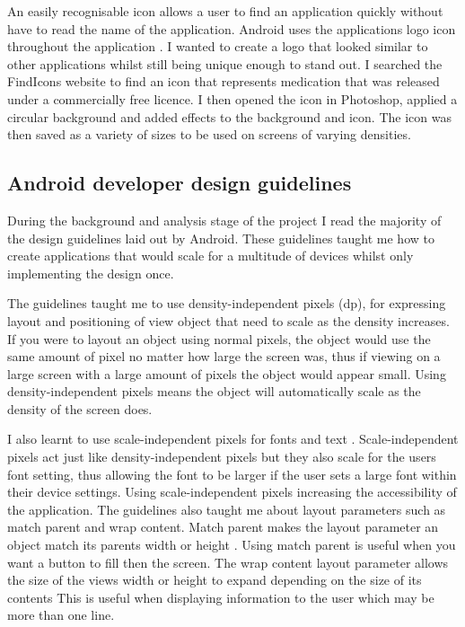 An easily recognisable icon allows a user to find an application quickly without have to read the name of the application. Android uses the applications logo icon throughout the application \cite{android}. I wanted to create a logo that looked similar to other applications whilst still being unique enough to stand out. I searched the FindIcons website \cite{findicons} to find an icon that represents medication that was released under a commercially free licence. I then opened the icon in Photoshop, applied a circular background and added effects to the background and icon. The icon was then saved as a variety of sizes to be used on screens of varying densities.

\subsection{Android developer design guidelines}

During the background and analysis stage of the project I read the majority of the design guidelines \cite{android_design} laid out by Android. These guidelines taught me how to create applications that would scale for a multitude of devices whilst only implementing the design once. 

The guidelines \cite{android_design} taught me to use density-independent pixels (dp), for expressing layout and positioning of view object that need to scale as the density increases. If you were to layout an object using normal pixels, the object would use the same amount of pixel no matter how large the screen was, thus if viewing on a large screen with a large amount of pixels the object would appear small. Using density-independent pixels means the object will automatically scale as the density of the screen does.

I also learnt to use scale-independent pixels for fonts and text \cite{android_design}. Scale-independent pixels act just like density-independent pixels but they also scale for the users font setting, thus allowing the font to be larger if the user sets a large font within their device settings. Using scale-independent pixels increasing the accessibility of the application.
The guidelines also taught me about layout parameters such as match parent and wrap content. Match parent makes the layout parameter an object match its parents width or height \cite{android_design}. Using match parent is useful when you want a button to fill then the screen. The wrap content layout parameter allows the size of the views width or height to expand depending on the size of its contents This is useful when displaying information to the user which may be more than one line. 

